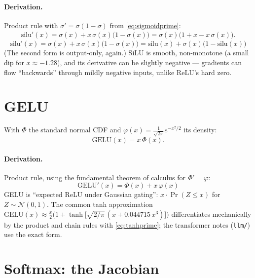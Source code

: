 \documentclass[11pt]{article}
\begin{document}
\paragraph{Derivation.} Product rule with
$\sigma' = \sigma(1-\sigma)$ from \eqref{eq:sigmoidprime}:
\begin{align*}
  \mathrm{silu}'(x)
  = \sigma(x) + x\,\sigma(x)\bigl(1 - \sigma(x)\bigr)
  = \sigma(x)\bigl(1 + x - x\,\sigma(x)\bigr).
\end{align*}
\begin{equation}
  \boxed{\;\mathrm{silu}'(x)
  = \sigma(x) + x\,\sigma(x)\bigl(1-\sigma(x)\bigr)
  = \mathrm{silu}(x) + \sigma(x)\bigl(1 - \mathrm{silu}(x)\bigr)\;}
  \label{eq:siluprime}
\end{equation}
(The second form is output-only, again.) SiLU is smooth, non-monotone
(a small dip for $x \approx -1.28$), and its derivative can be
slightly negative --- gradients can flow ``backwards'' through mildly
negative inputs, unlike ReLU's hard zero.

\section{GELU}

With $\Phi$ the standard normal CDF and
$\varphi(x) = \frac{1}{\sqrt{2\pi}}e^{-x^2/2}$ its density:
\begin{equation}
  \mathrm{GELU}(x) = x\,\Phi(x).
  \label{eq:gelu}
\end{equation}

\paragraph{Derivation.} Product rule, using the fundamental theorem of
calculus for $\Phi' = \varphi$:
\begin{equation}
  \boxed{\;\mathrm{GELU}'(x) = \Phi(x) + x\,\varphi(x)\;}
  \label{eq:geluprime}
\end{equation}
GELU is ``expected ReLU under Gaussian gating'':
$x \cdot \Pr(Z \le x)$ for $Z \sim \mathcal{N}(0,1)$. The common
tanh approximation
$\mathrm{GELU}(x) \approx \tfrac{x}{2}\bigl(1 +
\tanh\bigl[\sqrt{2/\pi}\,(x + 0.044715\,x^{3})\bigr]\bigr)$
differentiates mechanically by the product and chain rules with
\eqref{eq:tanhprime}; the transformer notes (\texttt{llm/}) use the
exact form.

\section{Softmax: the Jacobian}
\end{document}
